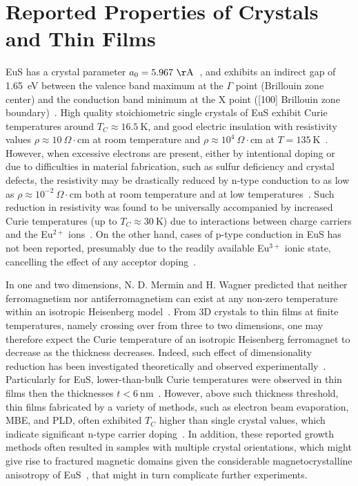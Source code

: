\section{Reported Properties of Crystals and Thin Films}\label{sec:EuS_previous}
EuS has a crystal parameter $a_0=5.967~\mathrm\AA$~\cite{EuS_Shafer}, and exhibits an indirect gap of 1.65~eV between the valence band maximum at the $\Gamma$ point (Brillouin zone center) and the conduction band minimum at the X point ([100] Brillouin zone boundary)~\cite{EuX_absorption, EuS_band_th1, EuS_band_th2}. High quality stoichiometric single crystals of EuS exhibit Curie temperatures around $T_C\approx16.5~\mathrm{K}$, and good electric insulation with resistivity values $\rho\approx10~\Omega\cdot\mathrm{cm}$ at room temperature and $\rho\approx10^4~\Omega\cdot\mathrm{cm}$ at $T=135~\mathrm{K}$~\cite{EuS_Shafer}. However, when excessive electrons are present, either by intentional doping or due to difficulties in material fabrication, such as sulfur deficiency and crystal defects, the resistivity may be drastically reduced by n-type conduction to as low as $\rho\approx10^{-2}~\Omega\cdot\mathrm{cm}$ both at room temperature and at low temperatures~\cite{EuS_LaDoped, EuS_ntype}. Such reduction in resistivity was found to be universally accompanied by increased Curie temperatures (up to $T_C\approx30~\mathrm{K}$) due to interactions between charge carriers and the Eu$^{2+}$ ions~\cite{EuS_TC_doping, EuS_ntype, EuX_doped_transport, EuX_RKKY}. On the other hand, cases of p-type conduction in EuS has not been reported, presumably due to the readily available Eu$^{3+}$ ionic state, cancelling the effect of any acceptor doping~\cite{EuX_doped_transport}.

In one and two dimensions, N. D. Mermin and H. Wagner predicted that neither ferromagnetism nor antiferromagnetism can exist at any non-zero temperature within an isotropic Heisenberg model~\cite{Mermin1966}. From 3D crystals to thin films at finite temperatures, namely crossing over from three to two dimensions, one may therefore expect the Curie temperature of an isotropic Heisenberg ferromagnet to decrease as the thickness decreases. Indeed, such effect of dimensionality reduction has been investigated theoretically and observed experimentally~\cite{thickness_Tc_theory, thickness_Tc_exp}. Particularly for EuS, lower-than-bulk Curie temperatures were observed in thin films then the thicknesses $t < 6~\mathrm{nm}$~\cite{EuS_MBE_Muller}. However, above such thickness threshold, thin films fabricated by a variety of methods, such as electron beam evaporation, MBE, and PLD, often exhibited $T_C$ higher than single crystal values, which indicate significant n-type carrier doping~\cite{EuS_MBE_Muller, EuS_thin_film_Keller, EuS_PLD1, EuS_PLD2}. In addition, these reported growth methods often resulted in samples with multiple crystal orientations, which might give rise to fractured magnetic domains given the considerable magnetocrystalline anisotropy of EuS~\cite{EuS_anisotropy}, that might in turn complicate further experiments.

